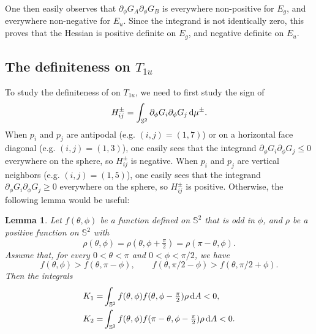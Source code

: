 \documentclass[a4paper]{amsart}
\newcommand{\uS}{\mathbb{S}}
\newcommand{\dd}{{\rm d}}
\theoremstyle{plain} %
\newtheorem*{lemma}{Lemma}
\theoremstyle{definition} %
\theoremstyle{remark}
\begin{document}
One then easily observes that $\partial_\phi G_A \partial_\phi G_B$ is
everywhere non-positive for $E_g$, and everywhere non-negative for $E_u$.
Since the integrand is not identically zero, this proves that the Hessian is
positive definite on $E_g$, and negative definite on $E_u$.

\subsection{The definiteness on \texorpdfstring{$T_{1u}$}{T1u}}

To study the definiteness of on $T_{1u}$, we need to first study the sign of
\[
	H^\pm_{ij} = \int_{\uS^2} \partial_\phi G_i \partial_\phi G_j \,
	\dd \mu^\pm.
\]
When $p_i$ and $p_j$ are antipodal (e.g. $(i,j) = (1,7)$) or on a horizontal
face diagonal (e.g. $(i,j) = (1,3)$), one easily sees that the integrand
$\partial_\phi G_i \partial_\phi G_j \le 0$ everywhere on the sphere, so
$H^\pm_{ij}$ is negative.  When $p_i$ and $p_j$ are vertical neighbors (e.g.
$(i,j) = (1,5)$), one easily sees that the integrand $\partial_\phi G_i
\partial_\phi G_j \ge 0$ everywhere on the sphere, so $H^\pm_{ij}$ is positive.
Otherwise, the following lemma would be useful:

\begin{lemma}
	Let $f(\theta, \phi)$ be a function defined on $\uS^2$ that is odd in $\phi$,
	and $\rho$ be a positive function on $\uS^2$ with
	\[
		\rho(\theta, \phi) = \rho(\theta, \phi+\tfrac{\pi}{2}) = \rho(\pi - \theta, \phi).
	\]
	Assume that, for every $0 < \theta < \pi$ and $0 < \phi < \pi/2$, we have
	\[
		f(\theta, \phi) > f(\theta, \pi - \phi), \qquad
		f(\theta, \pi/2 - \phi) > f(\theta, \pi/2 + \phi).
	\]
	Then the integrals
	\begin{align*}
		K_1 =& \int_{\uS^2} f(\theta, \phi) f(\theta, \phi - \tfrac{\pi}{2}) \rho \, \dd A < 0,\\
		K_2 =& \int_{\uS^2} f(\theta, \phi) f(\pi - \theta, \phi - \tfrac{\pi}{2}) \rho \, \dd A < 0.
	\end{align*}
\end{lemma}
\end{document}
